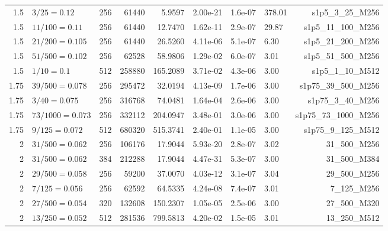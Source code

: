 \begin{center}
\begin{longtable}{@{}rlrrrlllr@{}}
1.5 & $3/25=0.12$ & 256 & 61440 & 5.9597 & 2.00e-21 & 1.6e-07 & 378.01 & s1p5\_3\_25\_M256\\
1.5 & $11/100=0.11$ & 256 & 61440 & 12.7470 & 1.62e-11 & 2.9e-07 & 29.87 & s1p5\_11\_100\_M256\\
1.5 & $21/200=0.105$ & 256 & 61440 & 26.5260 & 4.11e-06 & 5.1e-07 & 6.30 & s1p5\_21\_200\_M256\\
1.5 & $51/500=0.102$ & 256 & 62528 & 58.9806 & 1.29e-02 & 6.0e-07 & 3.01 & s1p5\_51\_500\_M256\\
1.5 & $1/10=0.1$ & 512 & 258880 & 165.2089 & 3.71e-02 & 4.3e-06 & 3.00 & s1p5\_1\_10\_M512\\
1.75 & $39/500=0.078$ & 256 & 295472 & 32.0194 & 4.13e-09 & 1.7e-06 & 3.00 & s1p75\_39\_500\_M256\\
1.75 & $3/40=0.075$ & 256 & 316768 & 74.0481 & 1.64e-04 & 2.6e-06 & 3.00 & s1p75\_3\_40\_M256\\
1.75 & $73/1000=0.073$ & 256 & 332112 & 204.0947 & 3.48e-01 & 3.0e-06 & 3.00 & s1p75\_73\_1000\_M256\\
1.75 & $9/125=0.072$ & 512 & 680320 & 515.3741 & 2.40e-01 & 1.1e-05 & 3.00 & s1p75\_9\_125\_M512\\
2 & $31/500=0.062$ & 256 & 106176 & 17.9044 & 5.93e-20 & 2.8e-07 & 3.02 & 31\_500\_M256\\
2 & $31/500=0.062$ & 384 & 212288 & 17.9044 & 4.47e-31 & 5.3e-07 & 3.00 & 31\_500\_M384\\
2 & $29/500=0.058$ & 256 & 59200 & 37.0070 & 4.03e-12 & 3.1e-07 & 3.04 & 29\_500\_M256\\
2 & $7/125=0.056$ & 256 & 62592 & 64.5335 & 4.24e-08 & 7.4e-07 & 3.01 & 7\_125\_M256\\
2 & $27/500=0.054$ & 320 & 132608 & 150.2307 & 1.05e-05 & 2.5e-06 & 3.00 & 27\_500\_M320\\
2 & $13/250=0.052$ & 512 & 281536 & 799.5813 & 4.20e-02 & 1.5e-05 & 3.01 & 13\_250\_M512\\
\end{longtable}
\end{center}

